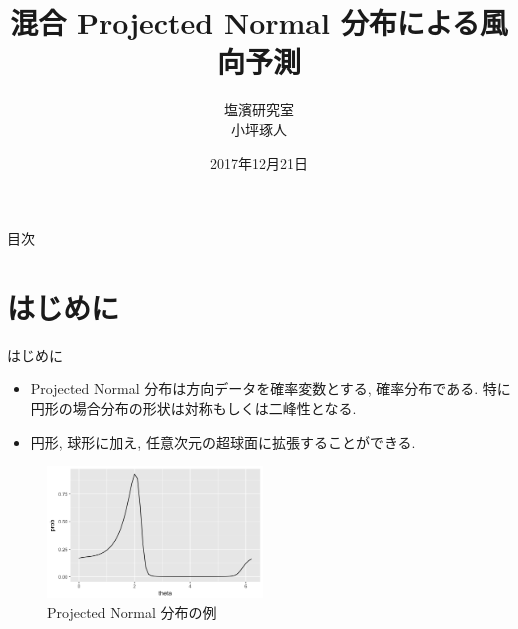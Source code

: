 \documentclass[dvipdfmx]{beamer}
\title[タイトル]{混合 Projected Normal 分布による風向予測}
\author[発表者名]{塩濱研究室\\ 小坪琢人}
\institute[所属]{東京理科大学\ 工学部経営工学科4年\\学籍番号 4414036}
\date[日付]{2017年12月21日}
\begin{document}
\begin{frame}[plain]
\titlepage
\end{frame}
	
\begin{frame}{目次}
\tableofcontents
\end{frame}

\section{はじめに}
\begin{frame}{はじめに}

\begin{itemize}

\item Projected Normal 分布は方向データを確率変数とする, 確率分布である. 特に円形の場合分布の形状は対称もしくは二峰性となる.

\item 円形, 球形に加え, 任意次元の超球面に拡張することができる.  \cite{GPN}

\end{itemize}

\vspace{-0.3cm}
\begin{figure}[H]
\begin{center}
\includegraphics[clip,height= 35mm]{data/PN_sample1.png}
\end{center}
\caption{Projected Normal 分布の例}
\label{pnsample1}
\end{figure}

\end{frame}
\end{document}
